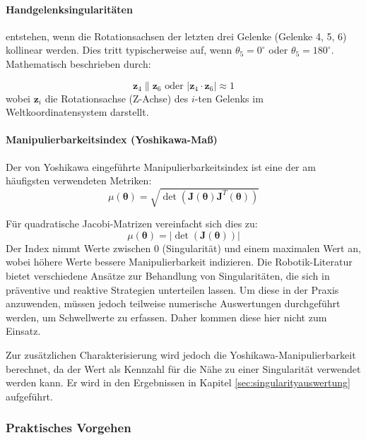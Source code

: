 \paragraph{Handgelenksingularitäten} entstehen, wenn die Rotationsachsen der
letzten drei Gelenke (Gelenke 4, 5, 6) kollinear werden. Dies tritt
typischerweise auf, wenn $\theta_5 = 0^\circ$ oder $\theta_5 = 180^\circ$. Mathematisch
beschrieben durch:

\begin{equation}
	\mathbf{z}_4 \parallel \mathbf{z}_6 \text{ oder } |\mathbf{z}_4 \cdot \mathbf{z}_6| \approx 1
	\label{eq:wrist_singularity}
\end{equation}
\noindent
wobei $\mathbf{z}_i$ die Rotationsachse (Z-Achse) des $i$-ten Gelenks im
Weltkoordinatensystem darstellt.

\paragraph{Manipulierbarkeitsindex (Yoshikawa-Maß)} Der von Yoshikawa
\cite{yoshikawa1985manipulability} eingeführte Manipulierbarkeitsindex ist eine
der am häufigsten verwendeten Metriken: \begin{equation}
	\mu(\boldsymbol{\theta}) =
	\sqrt{\det(\mathbf{J}(\boldsymbol{\theta})\mathbf{J}^T(\boldsymbol{\theta}))}
	\label{eq:yoshikawa_measure} \end{equation}

Für quadratische Jacobi-Matrizen vereinfacht sich dies zu: \begin{equation}
	\mu(\boldsymbol{\theta}) = |\det(\mathbf{J}(\boldsymbol{\theta}))|
	\label{eq:yoshikawa_simplified} \end{equation}
\noindent
Der Index nimmt Werte zwischen 0 (Singularität) und einem maximalen Wert an,
wobei höhere Werte bessere Manipulierbarkeit indizieren. Die Robotik-Literatur
bietet verschiedene Ansätze zur Behandlung von Singularitäten, die sich in
präventive und reaktive Strategien unterteilen lassen. Um diese in der Praxis
anzuwenden, müssen jedoch teilweise numerische Auswertungen durchgeführt werden,
um Schwellwerte zu erfassen. Daher kommen diese hier nicht zum Einsatz.

Zur zusätzlichen Charakterisierung wird jedoch die Yoshikawa-Manipulierbarkeit
berechnet, da der Wert als Kennzahl für die Nähe zu einer Singularität verwendet
werden kann. Er wird in den Ergebnissen in Kapitel \ref{sec:singularityauswertung} aufgeführt.

\subsubsection{Praktisches Vorgehen} \label{sssec:Framework_Implementierung}

